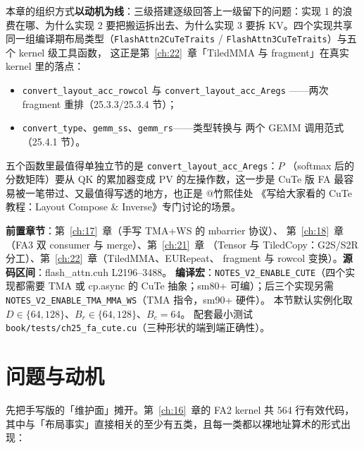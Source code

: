 本章的组织方式\textbf{以动机为线}：三级搭建逐级回答上一级留下的问题：实现 1
的浪费在哪、为什么实现 2 要把搬运拆出去、为什么实现 3 要拆 KV。四个实现共享
同一组编译期布局类型（\texttt{Flash\allowbreak{}Attn2\allowbreak{}Cu\allowbreak{}Te\allowbreak{}Traits} /
\texttt{Flash\allowbreak{}Attn3\allowbreak{}Cu\allowbreak{}Te\allowbreak{}Traits}）与五个 kernel 级工具函数，
这正是第~\ref{ch:22}~章「TiledMMA 与 fragment」在真实 kernel 里的落点：

\begin{itemize}[itemsep=1pt,topsep=2pt]
  \item \texttt{convert\_\allowbreak{}layout\_\allowbreak{}acc\_\allowbreak{}rowcol} 与 \texttt{convert\_\allowbreak{}layout\_\allowbreak{}acc\_\allowbreak{}Aregs}
        ——两次 fragment 重排（25.3.3/25.3.4 节）；
  \item \texttt{convert\_\allowbreak{}type}、\texttt{gemm\_ss}、\texttt{gemm\_rs}——类型转换与
        两个 GEMM 调用范式（25.4.1 节）。
\end{itemize}

五个函数里最值得单独立节的是 \texttt{convert\_\allowbreak{}layout\_\allowbreak{}acc\_\allowbreak{}Aregs}：$P$
（softmax 后的分数矩阵）要从 QK 的累加器变成 PV 的左操作数，这一步是 CuTe 版
FA 最容易被一笔带过、又最值得写透的地方，也正是 @竹熙佳处
《写给大家看的 CuTe 教程：Layout Compose \& Inverse》专门讨论的场景。

\textbf{前置章节}：第~\ref{ch:17}~章（手写 TMA+WS 的 mbarrier 协议）、
第~\ref{ch:18}~章（FA3 双 consumer 与 merge）、第~\ref{ch:21}~章
（Tensor 与 TiledCopy：G2S/S2R 分工）、第~\ref{ch:22}~章（TiledMMA、EURepeat、
fragment 与 rowcol 变换）。\textbf{源码区间}：flash\_attn.cuh L2196--3488。
\textbf{编译宏}：\texttt{NOTES\_\allowbreak{}V2\_\allowbreak{}ENABLE\_\allowbreak{}CUTE}（四个实现都需要 TMA 或
cp.async 的 CuTe 抽象；sm80+ 可编）；后三个实现另需
\texttt{NOTES\_\allowbreak{}V2\_\allowbreak{}ENABLE\_\allowbreak{}TMA\_\allowbreak{}MMA\_\allowbreak{}WS}（TMA 指令，sm90+ 硬件）。
本节默认实例化取 $D\in\{64,128\}$、$B_r\in\{64,128\}$、$B_c=64$。
配套最小测试 \texttt{book/\allowbreak{}tests/\allowbreak{}ch25\_\allowbreak{}fa\_\allowbreak{}cute.\allowbreak{}cu}（三种形状的端到端正确性）。

\section{问题与动机}

先把手写版的「维护面」摊开。第~\ref{ch:16}~章的 FA2 kernel 共 564 行有效代码，
其中与「布局事实」直接相关的至少有五类，且每一类都以裸地址算术的形式出现：

